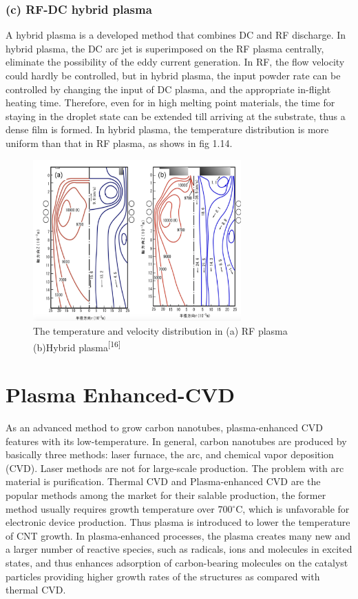 \subsubsection{(c) RF-DC hybrid plasma}
A hybrid plasma is a developed method that combines DC and RF discharge. In hybrid plasma, the DC arc jet is superimposed on the RF plasma centrally, eliminate the possibility of the eddy current generation. In RF, the flow velocity could hardly be controlled, but in hybrid plasma, the input powder rate can be controlled by changing the input of DC plasma, and the appropriate in-flight heating time. Therefore, even for in high melting point materials, the time for staying in the droplet state can be extended till arriving at the substrate, thus a dense film is formed. In hybrid plasma, the temperature distribution is more uniform than that in RF plasma, as shows in fig 1.14.
\begin{figure}[h]
\centering
\includegraphics[width=8cm]{src/fig/fig14.png}
\caption{The temperature and velocity distribution in (a) RF plasma (b)Hybrid plasma\textsuperscript{[16]}}
\end{figure}
\section{Plasma Enhanced-CVD}
As an advanced method to grow carbon nanotubes, plasma-enhanced CVD features with its low-temperature. In general, carbon nanotubes are produced by basically three methods: laser furnace, the arc, and chemical vapor deposition (CVD). Laser methods are not for large-scale production. The problem with arc material is purification. Thermal CVD and Plasma-enhanced CVD are the popular methods among the market for their salable production, the former method usually requires growth temperature over 700\(^\circ\)C, which is unfavorable for electronic device production. Thus plasma is introduced to lower the temperature of CNT growth. In plasma-enhanced processes, the plasma creates many new and a larger number of reactive species, such as radicals, ions and molecules in excited states, and thus enhances adsorption of carbon-bearing molecules on the catalyst particles providing higher growth rates of the structures as compared with thermal CVD. 


